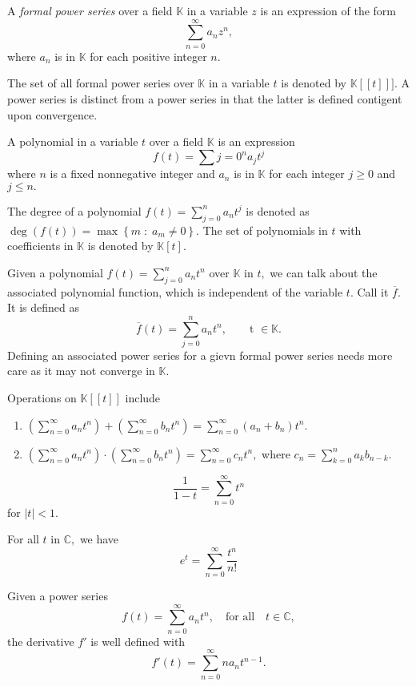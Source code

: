
\begin{definition}
	A \emph{formal power series} over a field $\mathbb{K}$ in a variable $z$
	is an expression of the form
	$$ \sum_{n=0}^{\infty} a_n z^n,$$
	where $a_n$ is in $\mathbb{K}$ for each positive integer $n.$
\end{definition}
The set of all formal power series over $\mathbb{K}$ 
in a variable $t$ is denoted by $ \mathbb{K} [[t]]].$
A power series is distinct from a power series in that the latter is defined contigent
upon convergence.

\begin{definition}[Polynomial]
	A polynomial in a variable $t$ over a field $\mathbb{K}$ is an expression
	$$ f(t) = \sum{j=0}^{n} a_j t^j $$
	where $n$ is a fixed nonnegative integer and $a_n$ is in $\mathbb{K}$ for each integer $j \geq 0$ and $j \leq n.$
\end{definition}


The degree of a polynomial $f(t) = \sum_{j=0}^{n} a_n t^j$ is denoted as
$\deg(f(t)) = \max \left\{ m \; : \; a_m \not = 0 \right\}.$ The set of polynomials in $t$
with coefficients in $\mathbb{K}$ is denoted by $\mathbb{K} [t].$

Given a polynomial $f(t) = \sum_{j=0}^{n}  a_n t^n$ over $\mathbb{K}$ in $t,$ we can talk
about the associated polynomial function, which is independent of the variable $t.$
Call it $\overline{f}.$ It is defined as 
$$ \overline{f} (t) = \sum_{j=0}^{n} a_n t^n, \qquad \text{t } \in \mathbb{K} .$$
Defining an associated power series for a gievn formal power series needs more care
as it may not converge in $\mathbb{K}.$

Operations on $\mathbb{K} [[t]]$ include
\begin{enumerate}
	\item $ \left( \sum_{n=0}^{\infty} a_n t^n \right) 
	+ \left( \sum_{n=0}^{\infty} b_n t^n \right) 
	= \sum_{n=0}^{\infty} (a_n + b_n ) t^n.$
	\item$ \left( \sum_{n=0}^{\infty} a_n t^n \right) 
		\cdot \left( \sum_{n=0}^{\infty} b_n t^n \right) 
		 = \sum_{n=0}^{\infty} c_n t^n,$ 
		 where $c_n = \sum_{k=0}^{n} a_k b_{n-k}.$
\end{enumerate}
\begin{example}
	$$ \frac{1}{1-t} = \sum_{n=0}^{\infty}  t^n $$
	for $ \lvert t \rvert < 1.$
\end{example}

\begin{example}
	For all $t $ in $\mathbb{C},$ we have
	$$ e^t = \sum_{n=0}^{\infty} \frac{t^n}{n!} $$
\end{example}

\begin{example}
	Given a power series 
	$$f(t) = \sum_{n=0}^{\infty} a_n t^n, \quad \text{for all} \quad t \in \mathbb{C},$$
	the derivative $f'$ is well defined with
	$$f'(t) = \sum_{n=0}^{\infty} n a_n t^{n-1} .$$
\end{example}



